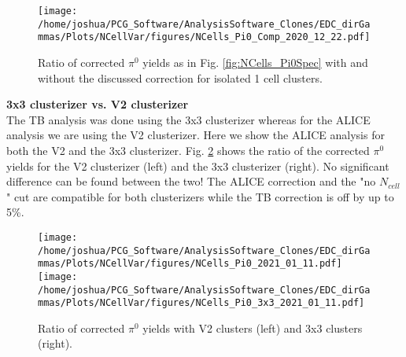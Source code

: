 \documentclass[ALICE]{ALICE_analysis_notes}
\begin{document}
\begin{figure}[h!]
	\centering
	\texttt{[image: /home/joshua/PCG\_Software/AnalysisSoftware\_Clones/EDC\_dirGammas/Plots/NCellVar/figures/NCells\_Pi0\_Comp\_2020\_12\_22.pdf]}
	
	\caption{ Ratio of corrected $\pi^{0}$ yields as in Fig. \ref{fig:NCells_Pi0Spec} with and without the discussed correction for isolated 1 cell clusters.  }
	\label{fig:ShowerOverlaps_Result}
\end{figure}

\newpage

\textbf{3x3 clusterizer vs. V2 clusterizer}\\
The TB analysis was done using the 3x3 clusterizer whereas for the ALICE analysis we are using the V2 clusterizer. Here we show the ALICE analysis for both the V2 and the 3x3 clusterizer. Fig. \ref{fig:3x3VsV2} shows the ratio of the corrected $\pi^{0}$ yields for the V2 clusterizer (left) and the 3x3 clusterizer (right). No significant difference can be found between the two! The ALICE correction and the "no $N_{cell}$" cut are compatible for both clusterizers while the TB correction is off by up to 5\%.

\begin{figure}[h!]
	\centering
	\texttt{[image: /home/joshua/PCG\_Software/AnalysisSoftware\_Clones/EDC\_dirGammas/Plots/NCellVar/figures/NCells\_Pi0\_2021\_01\_11.pdf]}	
	\texttt{[image: /home/joshua/PCG\_Software/AnalysisSoftware\_Clones/EDC\_dirGammas/Plots/NCellVar/figures/NCells\_Pi0\_3x3\_2021\_01\_11.pdf]}
	
	
	
	\caption{ Ratio of corrected $\pi^{0}$ yields with V2 clusters (left) and 3x3 clusters (right).  }
	\label{fig:3x3VsV2}
\end{figure}
\end{document}
